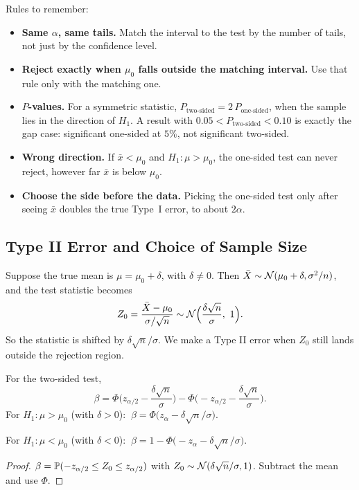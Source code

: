 Rules to remember:
\begin{itemize}
  \item \textbf{Same $\alpha$, same tails.} Match the interval to the test by the number of tails, not just by the confidence level.
  \item \textbf{Reject exactly when $\mu_0$ falls outside the matching interval.} Use that rule only with the matching one.
  \item \textbf{$P$-values.} For a symmetric statistic, $P_{\text{two-sided}}=2\,P_{\text{one-sided}}$, when the sample lies in the direction of $H_1$. A result with $0.05<P_{\text{two-sided}}<0.10$ is exactly the gap case: significant one-sided at $5\%$, not significant two-sided.
  \item \textbf{Wrong direction.} If $\bar{x}<\mu_0$ and $H_1:\mu>\mu_0$, the one-sided test can never reject, however far $\bar{x}$ is below $\mu_0$.
  \item \textbf{Choose the side before the data.} Picking the one-sided test only after seeing $\bar{x}$ doubles the true Type~I error, to about $2\alpha$.
\end{itemize}

\subsection{Type II Error and Choice of Sample Size}

Suppose the true mean is $\mu=\mu_0+\delta$, with $\delta\ne0$. Then $\bar{X}\sim\mathcal{N}(\mu_0+\delta,\sigma^2/n)$, and the test statistic becomes
\[ Z_0=\frac{\bar{X}-\mu_0}{\sigma/\sqrt n}\sim\mathcal{N}\Big(\frac{\delta\sqrt n}{\sigma},\ 1\Big). \]
So the statistic is shifted by $\delta\sqrt n/\sigma$. We make a Type II error when $Z_0$ still lands outside the rejection region.

\begin{theorem}\label{thm:beta-z}
For the two-sided test,
\[ \beta=\Phi\Big(z_{\alpha/2}-\frac{\delta\sqrt n}\sigma\Big)-\Phi\Big(-z_{\alpha/2}-\frac{\delta\sqrt n}\sigma\Big). \]
For $H_1:\mu>\mu_0$ (with $\delta>0$): $\ \beta=\Phi\big(z_\alpha-\delta\sqrt n/\sigma\big)$.

For $H_1:\mu<\mu_0$ (with $\delta<0$): $\ \beta=1-\Phi\big(-z_\alpha-\delta\sqrt n/\sigma\big)$.
\end{theorem}

\begin{proof}
$\beta=\mathbb{P}(-z_{\alpha/2}\le Z_0\le z_{\alpha/2})$ with $Z_0\sim\mathcal{N}(\delta\sqrt n/\sigma,1)$. Subtract the mean and use $\Phi$.
\end{proof}


